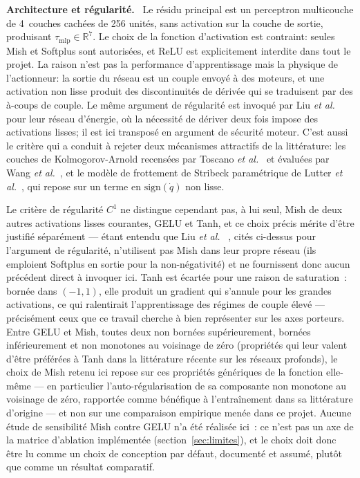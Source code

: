 \documentclass[a4paper, oneside]{article}
\newcommand{\parag}[1]{%
    \par\medskip\noindent\textbf{#1}\ \ignorespaces%
}
\newcommand{\qd}{\ensuremath{\dot{q}}}
\newcommand{\taumlp}{\ensuremath{\tau_{\mathrm{mlp}}}}
\newcommand{\Rset}{\ensuremath{\mathbb{R}}}
\begin{document}
\parag{Architecture et régularité.} Le résidu principal est un perceptron
multicouche de 4~couches cachées de 256 unités, sans activation sur la couche de
sortie, produisant $\taumlp \in \Rset^{7}$. Le choix de la fonction
d'activation est contraint: seules Mish et Softplus sont autorisées, et ReLU
est explicitement interdite dans tout le projet. La raison n'est pas la
performance d'apprentissage mais la physique de l'actionneur: la sortie du
réseau est un couple envoyé à des moteurs, et une activation non lisse produit
des discontinuités de dérivée qui se traduisent par des à-coups de couple. Le
même argument de régularité est invoqué par Liu \emph{et al.}~\cite{liu2024}
pour leur réseau d'énergie, où la nécessité de dériver deux fois impose des
activations lisses; il est ici transposé en argument de sécurité moteur. C'est
aussi le critère qui a conduit à rejeter deux mécanismes attractifs de la
littérature: les couches de Kolmogorov-Arnold recensées par
Toscano \emph{et al.}~\cite{toscano2025} et évaluées par
Wang \emph{et al.}~\cite{wang2025spel}, et le modèle de frottement de Stribeck
paramétrique de Lutter \emph{et al.}~\cite{lutter2019iros}, qui repose sur un
terme en $\mathrm{sign}(\qd)$ non lisse.

Le critère de régularité $C^{1}$ ne distingue cependant pas, à lui seul, Mish
de deux autres activations lisses courantes, GELU et Tanh, et ce choix précis
mérite d'être justifié séparément — étant entendu que Liu \emph{et al.}~
\cite{liu2024}, cités ci-dessus pour l'argument de régularité, n'utilisent pas
Mish dans leur propre réseau (ils emploient Softplus en sortie pour la
non-négativité) et ne fournissent donc aucun précédent direct à invoquer ici.
Tanh est écartée pour une raison de saturation~: bornée dans $(-1,1)$, elle
produit un gradient qui s'annule pour les grandes activations, ce qui
ralentirait l'apprentissage des régimes de couple élevé — précisément ceux que
ce travail cherche à bien représenter sur les axes porteurs. Entre GELU et
Mish, toutes deux non bornées supérieurement, bornées inférieurement et non
monotones au voisinage de zéro (propriétés qui leur valent d'être préférées à
Tanh dans la littérature récente sur les réseaux profonds), le choix de Mish
retenu ici repose sur ces propriétés génériques de la fonction elle-même — en
particulier l'auto-régularisation de sa composante non monotone au voisinage
de zéro, rapportée comme bénéfique à l'entraînement dans sa littérature
d'origine — et non sur une comparaison empirique menée dans ce projet. Aucune
étude de sensibilité Mish contre GELU n'a été réalisée ici~: ce n'est pas un
axe de la matrice d'ablation implémentée (section~\ref{sec:limites}), et le
choix doit donc être lu comme un choix de conception par défaut, documenté et
assumé, plutôt que comme un résultat comparatif.
\end{document}
